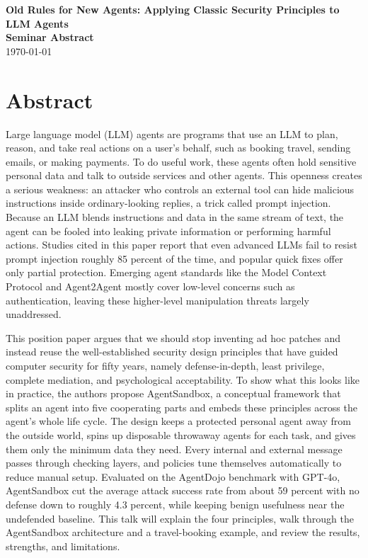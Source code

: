 \documentclass[12pt]{article}
\newcommand{\seminardate}{\today}
\begin{document}
\begin{center}
  {\LARGE\bfseries Old Rules for New Agents: Applying Classic Security Principles to LLM Agents}\\[8pt]
  {\large\bfseries Seminar Abstract}\\[6pt]
  {\normalsize \seminardate}
\end{center}
\vspace{1.5em}

\section*{Abstract}
Large language model (LLM) agents are programs that use an LLM to plan, reason, and take real actions on a user's behalf, such as booking travel, sending emails, or making payments. To do useful work, these agents often hold sensitive personal data and talk to outside services and other agents. This openness creates a serious weakness: an attacker who controls an external tool can hide malicious instructions inside ordinary-looking replies, a trick called prompt injection. Because an LLM blends instructions and data in the same stream of text, the agent can be fooled into leaking private information or performing harmful actions. Studies cited in this paper report that even advanced LLMs fail to resist prompt injection roughly 85 percent of the time, and popular quick fixes offer only partial protection. Emerging agent standards like the Model Context Protocol and Agent2Agent mostly cover low-level concerns such as authentication, leaving these higher-level manipulation threats largely unaddressed.

This position paper argues that we should stop inventing ad hoc patches and instead reuse the well-established security design principles that have guided computer security for fifty years, namely defense-in-depth, least privilege, complete mediation, and psychological acceptability. To show what this looks like in practice, the authors propose AgentSandbox, a conceptual framework that splits an agent into five cooperating parts and embeds these principles across the agent's whole life cycle. The design keeps a protected personal agent away from the outside world, spins up disposable throwaway agents for each task, and gives them only the minimum data they need. Every internal and external message passes through checking layers, and policies tune themselves automatically to reduce manual setup. Evaluated on the AgentDojo benchmark with GPT-4o, AgentSandbox cut the average attack success rate from about 59 percent with no defense down to roughly 4.3 percent, while keeping benign usefulness near the undefended baseline. This talk will explain the four principles, walk through the AgentSandbox architecture and a travel-booking example, and review the results, strengths, and limitations.
\end{document}
